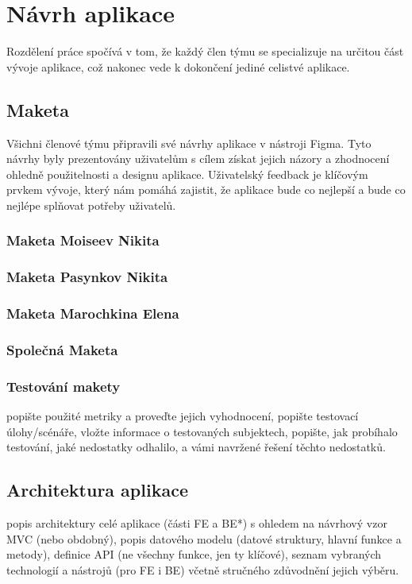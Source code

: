 \documentclass[a4paper, 11pt]{article}
\begin{document}
    \section{Návrh aplikace}
    Rozdělení práce spočívá v tom, že každý člen týmu se specializuje na určitou část vývoje aplikace, což nakonec vede k dokončení jediné celistvé aplikace.

	\subsection{Maketa}
   Všichni členové týmu připravili své návrhy aplikace v nástroji Figma. Tyto návrhy byly prezentovány uživatelům s cílem získat jejich názory a zhodnocení ohledně použitelnosti a designu aplikace. Uživatelský feedback je klíčovým prvkem vývoje, který nám pomáhá zajistit, že aplikace bude co nejlepší a bude co nejlépe splňovat potřeby uživatelů.
   \subsubsection{Maketa Moiseev Nikita}

   \subsubsection{Maketa Pasynkov Nikita}
   \subsubsection{Maketa Marochkina Elena}
   \subsubsection{Společná Maketa}


	\subsubsection{Testování makety}

	popište použité metriky a proveďte jejich vyhodnocení, popište
testovací úlohy/scénáře, vložte informace o testovaných subjektech, popište, jak
probíhalo testování, jaké nedostatky odhalilo, a vámi navržené řešení těchto
nedostatků.

	\subsection{Architektura aplikace}

	popis architektury celé aplikace (části FE a BE*) s ohledem na
návrhový vzor MVC (nebo obdobný), popis datového modelu (datové struktury,
hlavní funkce a metody), definice API (ne všechny funkce, jen ty klíčové), seznam
vybraných technologií a nástrojů (pro FE i BE) včetně stručného zdůvodnění jejich
výběru.
\end{document}
